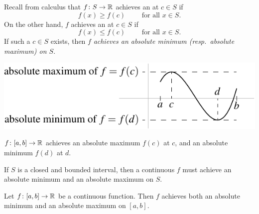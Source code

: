 Recall from calculus that $f \colon S \to {\mathbb{R}}$ achieves an
\emph{} at $c \in S$ if
\begin{equation*}
f(x) \geq f(c) \qquad \text{ for all $x \in S$.}
\end{equation*}
On the other hand, $f$ achieves an 
\emph{} at $c \in S$ if
\begin{equation*}
f(x) \leq f(c) \qquad \text{ for all $x \in S$.}
\end{equation*}
If such a $c \in S$ exists, then 
$f$ \emph{achieves an absolute minimum (resp.\ absolute maximum) on
$S$}.
\begin{myfigureht}
\includegraphics{figures/minmax}
\caption{$f \colon [a,b] \to {\mathbb{R}}$ achieves an absolute maximum $f(c)$ at
$c$, and an absolute minimum $f(d)$ at $d$.\label{fig:minmax}}
\end{myfigureht}

If $S$ is a closed
and bounded interval, then a continuous $f$
must achieve an absolute minimum and an absolute
maximum on $S$.

\begin{thm}
Let $f \colon [a,b] \to {\mathbb{R}}$ be a continuous function.  Then $f$
achieves both an absolute minimum and an absolute maximum on $[a,b]$.
\end{thm}

